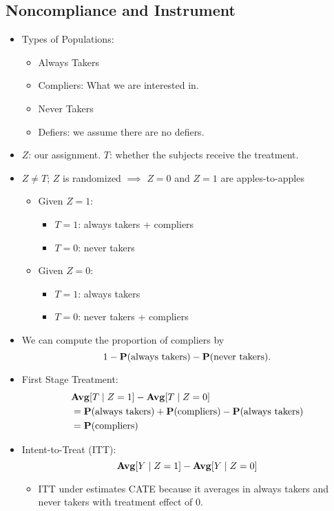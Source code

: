 \documentclass[10pt, letterpaper]{article}
\def\P{\vb{P}}
\def\Avg{\vb{Avg}}
\begin{document}
\begin{multicols}{2}
\section*{Noncompliance and Instrument}
\begin{itemize}
	\item Types of Populations:
	\begin{itemize}
		\item Always Takers
		\item Compliers: What we are interested in. 
		\item Never Takers
		\item Defiers: we assume there are no defiers.
	\end{itemize}
	\item $Z$: our assignment. $T$: whether the subjects receive the treatment.
	\item $Z\neq T$; $Z$ is randomized $\implies$ $Z=0$ and $Z=1$ are apples-to-apples
	\begin{itemize}
		\item Given $Z=1$: 
		\begin{itemize}
			\item $T=1$: always takers + compliers
			\item $T=0$: never takers
		\end{itemize}
		\item Given $Z=0$: 
		\begin{itemize}
			\item $T=1$: always takers
			\item $T=0$: never takers + compliers
		\end{itemize}
	\end{itemize}
	\item We can compute the proportion of compliers by \[1-\P(\text{always takers}) - \P(\text{never takers}).\]
	\item First Stage Treatment: \begin{align*}&\Avg[T\mid Z=1]-\Avg[T\mid Z=0]\\&=\P(\text{always takers})+\P(\text{compliers})-\P(\text{always takers})\\&=\P(\text{compliers})\end{align*}
	\item Intent-to-Treat (ITT): \[\Avg[Y\mid Z=1]-\Avg[Y\mid Z=0]\]
	\begin{itemize}
		\item ITT under estimates CATE because it averages in always takers and never takers with treatment effect of $0$.

\end{itemize}
\end{itemize}
\end{multicols}
\end{document}
